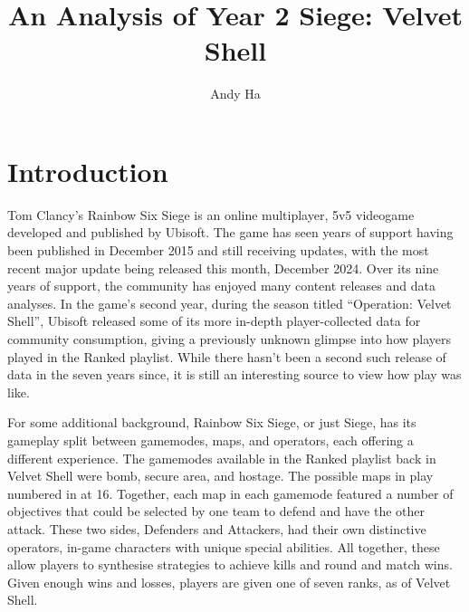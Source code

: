 \documentclass[12pt]{article}
\title{An Analysis of Year 2 Siege: Velvet Shell}
\author{Andy Ha}
\date{}
\begin{document}
\maketitle


\tableofcontents
\newpage


\section{Introduction}
Tom Clancy's Rainbow Six Siege is an online multiplayer, 5v5 videogame developed and published by Ubisoft.
The game has seen years of support having been published in December 2015 and still receiving updates, with the most recent major update being released this month, December 2024.
Over its nine years of support, the community has enjoyed many content releases and data analyses.
In the game's second year, during the season titled ``Operation: Velvet Shell'', Ubisoft released some of its more in-depth player-collected data for community consumption, giving a previously unknown glimpse into how players played in the Ranked playlist.
While there hasn't been a second such release of data in the seven years since, it is still an interesting source to view how play was like.

For some additional background, Rainbow Six Siege, or just Siege, has its gameplay split between gamemodes, maps, and operators, each offering a different experience.
The gamemodes available in the Ranked playlist back in Velvet Shell were bomb, secure area, and hostage.
The possible maps in play numbered in at 16.
Together, each map in each gamemode featured a number of objectives that could be selected by one team to defend and have the other attack.
These two sides, Defenders and Attackers, had their own distinctive operators, in-game characters with unique special abilities.
All together, these allow players to synthesise strategies to achieve kills and round and match wins.
Given enough wins and losses, players are given one of seven ranks, as of Velvet Shell.
\end{document}
